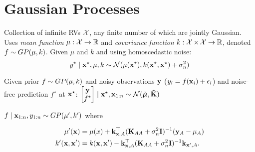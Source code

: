 \section{Gaussian Processes}

\begin{definition}[GP]
    Collection of infinite RVs \(\operatorname{\mathcal{X}}\), any finite number of which are jointly Gaussian. Uses
    \textit{mean function} \(\mu: \operatorname{\mathcal{X}} \to \mathbb{R}\) and \textit{covariance function} \(k: \operatorname{\mathcal{X}} \times \operatorname{\mathcal{X}} \to \mathbb{R}\), denoted \(f \sim GP(\mu, k)\).
    Given \(\mu\) and \(k\) and using homoscedastic noise:
    \[y^\star \mid \vb{x}^\star, \mu, k \sim \operatorname{\mathcal{N}}(\mu(\vb{x}^\star), k(\vb{x}^\star, \vb{x}^\star) + \sigma_n^2)\]
\end{definition}

\begin{definition}[Inference]
    Given prior \(f \sim GP(\mu, k)\) and noisy observations \(\vb{y}\) (\(y_i = f(\vb{x}_i) + \epsilon_i\)) and noise-free prediction \(f^\star\) at \(\vb{x}^\star\): \(\begin{bmatrix}
        \vb{y} \\ f^\star 
    \end{bmatrix}\mid \vb{x}^\star, \vb{x}_{1:n} \sim \operatorname{\mathcal{N}}(\tilde{\vb*{\mu}}, \tilde{\vb{K}})\)

\end{definition}

\begin{definition}[Posterior]
    \(f \mid \vb{x}_{1:n}, y_{1:n} \sim GP(\mu', k')\) where
    \begin{footnotesize}\vspace{-5pt}
        \begin{align*}
            \mu'(\vb{x}) &= \mu(x) + \vb{k}_{\vb{x}, A}^\top(\vb{K}_{AA} + \sigma_n^2\vb{I})^{-1}(\vb{y}_A - \mu_A) \\
            k'(\vb{x}, \vb{x}') &= k(\vb{x}, \vb{x}') - \vb{k}_{\vb{x}, A}^\top (\vb{K}_{AA} + \sigma_n^2\vb{I})^{-1}\vb{k}_{\vb{x}', A}.
        \end{align*}
    \end{footnotesize}
\end{definition}


